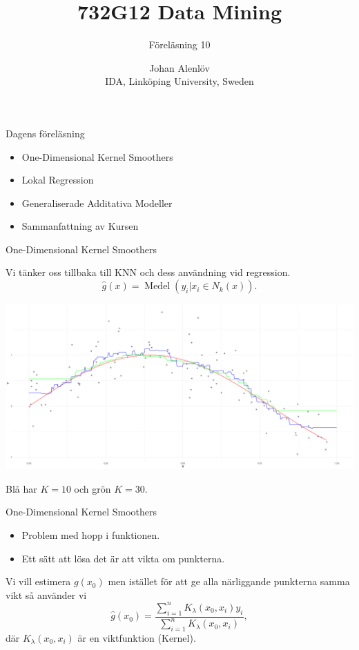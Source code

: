 \documentclass[10pt,english]{beamer}
\title{732G12 Data Mining}
\subtitle{Föreläsning 10}
\date{}
\author{Johan Alenlöv \\ IDA, Linköping University, Sweden}
\begin{document}
\maketitle

\begin{frame}{Dagens föreläsning}

    \begin{itemize}
        \item One-Dimensional Kernel Smoothers
        \item Lokal Regression
        \item Generaliserade Additativa Modeller
        \item Sammanfattning av Kursen
    \end{itemize}
    
\end{frame}

\begin{frame}{One-Dimensional Kernel Smoothers}

    Vi tänker oss tillbaka till KNN och dess användning vid regression.
    \begin{equation*}
        \hat{g}(x) = \operatorname{Medel}(y_i | x_i \in N_k(x)).
    \end{equation*}

    \includegraphics[width=\textwidth]{fig/knnreg.png}

    Blå har $K=10$ och grön $K=30$.
\end{frame}

\begin{frame}{One-Dimensional Kernel Smoothers}

    \begin{itemize}
        \item Problem med hopp i funktionen.
        \item Ett sätt att lösa det är att vikta om punkterna.
    \end{itemize}

    Vi vill estimera $g(x_0)$ men istället för att ge alla närliggande punkterna samma vikt så använder vi
    \begin{equation*}
        \hat{g}(x_0) = \frac{\sum_{i=1}^{n} K_{\lambda}(x_0, x_i) y_i}{\sum_{i=1}^{n}K_{\lambda}(x_0, x_i)},
    \end{equation*}
    där $K_{\lambda}(x_0, x_i)$ är en viktfunktion (Kernel).
\end{frame}
\end{document}
